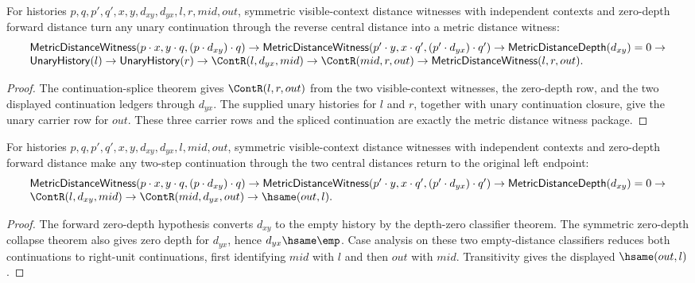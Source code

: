 \begin{theorem}
\label{thm:metric-prefix-independent-symmetric-zero-depth-witness-splice}
For histories $p,q,p',q',x,y,d_{xy},d_{yx},l,r,mid,out$, symmetric
visible-context distance witnesses with independent contexts and zero-depth
forward distance turn any unary continuation through the reverse central
distance into a metric distance witness:
$$
\begin{array}{l}
\mathsf{MetricDistanceWitness}(p\cdot x,y\cdot q,(p\cdot d_{xy})\cdot q)
\to
\mathsf{MetricDistanceWitness}(p'\cdot y,x\cdot q',(p'\cdot d_{yx})\cdot q')
\to
\mathsf{MetricDistanceDepth}(d_{xy})=0
\to
\\
\mathsf{UnaryHistory}(l)\to \mathsf{UnaryHistory}(r)\to
\ContR(l,d_{yx},mid)\to \ContR(mid,r,out)\to
\mathsf{MetricDistanceWitness}(l,r,out).
\end{array}
$$
\end{theorem}
\begin{proof}
The continuation-splice theorem gives \(\ContR(l,r,out)\) from the two
visible-context witnesses, the zero-depth row, and the two displayed
continuation ledgers through \(d_{yx}\). The supplied unary histories for
\(l\) and \(r\), together with unary continuation closure, give the unary
carrier row for \(out\). These three carrier rows and the spliced continuation
are exactly the metric distance witness package.
\end{proof}

\begin{theorem}
\label{thm:metric-distance-witness-prefix-independent-symmetric-zero-depth-distance-continuation-result}
For histories $p,q,p',q',x,y,d_{xy},d_{yx},l,mid,out$, symmetric
visible-context distance witnesses with independent contexts and zero-depth
forward distance make any two-step continuation through the two central
distances return to the original left endpoint:
$$
\begin{array}{l}
\mathsf{MetricDistanceWitness}(p\cdot x,y\cdot q,(p\cdot d_{xy})\cdot q)
\to
\mathsf{MetricDistanceWitness}(p'\cdot y,x\cdot q',(p'\cdot d_{yx})\cdot q')
\to
\mathsf{MetricDistanceDepth}(d_{xy})=0
\to
\\
\ContR(l,d_{xy},mid)\to
\ContR(mid,d_{yx},out)\to
\hsame(out,l).
\end{array}
$$
\end{theorem}
\begin{proof}
The forward zero-depth hypothesis converts $d_{xy}$ to the empty history by
the depth-zero classifier theorem. The symmetric zero-depth collapse theorem
also gives zero depth for $d_{yx}$, hence $d_{yx}\hsame\emp$. Case analysis on
these two empty-distance classifiers reduces both continuations to right-unit
continuations, first identifying $mid$ with $l$ and then $out$ with $mid$.
Transitivity gives the displayed $\hsame(out,l)$.
\end{proof}

